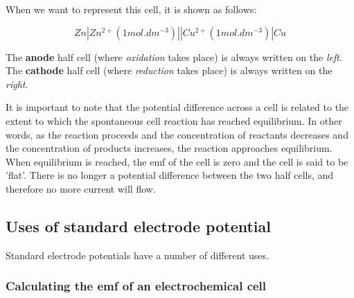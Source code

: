 

When we want to represent this cell, it is shown as follows:

\begin{center}
\begin{equation*}
Zn|Zn^{2+} (1 mol.dm^{-3})||Cu^{2+} (1 mol.dm^{-3})|Cu
\end{equation*}
\end{center}

The \textbf{anode} half cell (where \textit{oxidation} takes place) is always written on the \textit{left}. The \textbf{cathode} half cell (where \textit{reduction} takes place) is always written on the \textit{right}.

It is important to note that the potential difference across a cell is related to the extent to which the spontaneous cell reaction has reached equilibrium. In other words, as the reaction proceeds and the concentration of reactants decreases and the concentration of products increases, the reaction approaches equilibrium. When equilibrium is reached, the emf of the cell is zero and the cell is said to be 'flat'. There is no longer a potential difference between the two half cells, and therefore no more current will flow. 

\subsection{Uses of standard electrode potential}
\label{subsec:electrochemical:uses of sep}

Standard electrode potentials have a number of different uses.


\subsubsection{Calculating the emf of an electrochemical cell}


